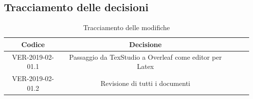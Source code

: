 \documentclass[12pt]{article}
\begin{document}
\begin{itemize}
    \subsection{Tracciamento delle decisioni}
    \begin{table}[!h] %
            \centering
            \renewcommand{\arraystretch}{2}
            \begin{tabular}{|c|c|p{6cm}|l|l|} %
                \rowcolor{orange!50} %
        		\hline
        		\textbf{Codice} & \textbf{Decisione}\\
                \hline
                VER-2019-02-01.1 & Passaggio da TexStudio a Overleaf come editor per Latex\\
                \hline
                VER-2019-02-01.2 & Revisione di tutti i documenti\\
                \hline
        \end{tabular}
        \caption{Tracciamento delle modifiche} %
        \label{tab:Tracciamento delle modifiche}
        \end{table}
    \end{itemize}
\end{document}

